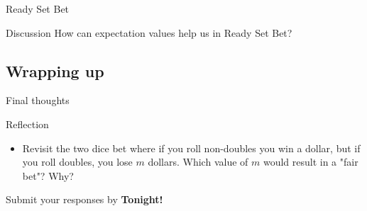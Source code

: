 \documentclass{beamer}
\begin{document}
\begin{frame}{Ready Set Bet}
  \begin{block}{Discussion}
    How can expectation values help us in Ready Set Bet?
  \end{block}
\end{frame}

\subsection{Wrapping up}

\begin{frame}{Final thoughts}
  \begin{block}{Reflection}
    \begin{itemize}
\pause
      \item Revisit the two dice bet where if you roll non-doubles you win a dollar, but if you roll doubles, you lose $m$ dollars.  Which value of $m$ would result in a "fair bet"?  Why?
    \end{itemize}
  \end{block}
\begin{center}
Submit your responses by \textbf{Tonight!}
\end{center}
\end{frame}
\end{document}
